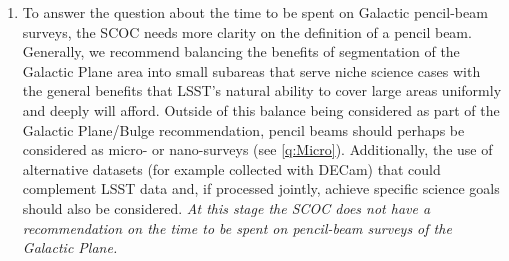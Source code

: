 \begin{enumerate}
\item 
To answer the question about the time to be spent on Galactic pencil-beam surveys, the SCOC needs more clarity on the definition of a pencil beam. Generally, we recommend balancing the benefits of segmentation of the Galactic Plane area into small subareas that serve niche science cases with the general benefits that LSST’s natural ability to cover large areas uniformly and deeply will afford. Outside of this balance being considered as part of the Galactic Plane/Bulge recommendation, pencil beams should perhaps be considered as micro- or nano-surveys (see \autoref{q:Micro}). Additionally, the use of alternative datasets (for example collected with DECam) that could complement LSST data and, if processed jointly, achieve specific science goals  should also be considered. \emph{At this stage the SCOC does not have a recommendation on the time to be spent on pencil-beam surveys of the Galactic Plane.}

\end{enumerate}

